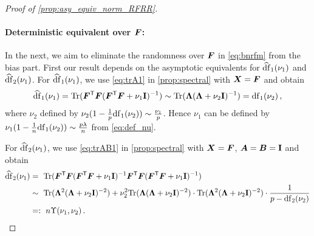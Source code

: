 \begin{proof}[Proof of \cref{prop:asy_equiv_norm_RFRR}]
\paragraph{Deterministic equivalent over ${\boldsymbol F}$:}

In the next, we aim to eliminate the randomness over ${\boldsymbol F}$ in \cref{eq:bnrfm} from the bias part.
First our result depends on the asymptotic equivalents for $\widehat{\rm df}_1(\nu_1)$ and $\widehat{\rm df}_2(\nu_1)$. For $\widehat{\rm df}_1(\nu_1)$, we use \cref{eq:trA1} in \cref{prop:spectral} with ${\boldsymbol X}={\boldsymbol F}$ and obtain
\[
\begin{aligned}
    \widehat{\rm df}_1(\nu_1) = {\rm Tr}({\boldsymbol F}^{\mathsf T} {\boldsymbol F} ({\boldsymbol F}^{\mathsf T} {\boldsymbol F} + \nu_1{\mathbf I})^{-1}) \sim {\rm Tr}({\boldsymbol \Lambda}({\boldsymbol \Lambda} + \nu_2{\mathbf I})^{-1})={\rm df}_1(\nu_2)\,,
\end{aligned}
\]
where $\nu_2$ defined by $\nu_2(1-\frac{1}{p}{\rm df}_1(\nu_2)) \sim \frac{\nu_1}{p}$. Hence $\nu_1$ can be defined by $\nu_1(1-\frac{1}{n}{\rm df}_1(\nu_2))\sim\frac{p\lambda}{n}$ from \cref{eq:def_nu}.

For $\widehat{\rm df}_2(\nu_1)$, we use \cref{eq:trAB1} in \cref{prop:spectral} with ${\boldsymbol X}={\boldsymbol F}$, ${\boldsymbol A}={\boldsymbol B}={\mathbf I}$ and obtain
\begin{equation}\label{eq:df2v1}
    \begin{split}
    \widehat{\rm df}_2(\nu_1) &=~ {\rm Tr}({\boldsymbol F}^{\mathsf T} {\boldsymbol F} ({\boldsymbol F}^{\mathsf T} {\boldsymbol F} + \nu_1{\mathbf I})^{-1} {\boldsymbol F}^{\mathsf T} {\boldsymbol F} ({\boldsymbol F}^{\mathsf T} {\boldsymbol F} + \nu_1{\mathbf I})^{-1})\\
    &\sim~ {\rm Tr}({\boldsymbol \Lambda}^2({\boldsymbol \Lambda} + \nu_2{\mathbf I})^{-2}) + \nu_2^2 {\rm Tr}({\boldsymbol \Lambda}({\boldsymbol \Lambda} + \nu_2{\mathbf I})^{-2}) \cdot {\rm Tr}({\boldsymbol \Lambda}^2({\boldsymbol \Lambda} + \nu_2{\mathbf I})^{-2}) \cdot \frac{1}{p - {\rm df}_2(\nu_2)}\\
    &=:~ n\Upsilon(\nu_1, \nu_2)\,. 
    \end{split}
\end{equation}


\end{proof}
